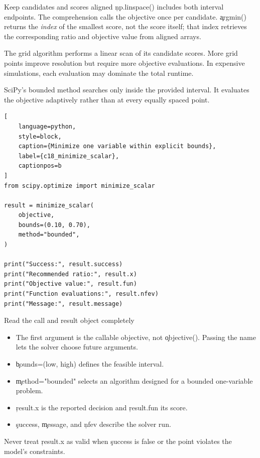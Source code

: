 \begin{SyntaxBox}{Keep candidates and scores aligned}
\c{np.linspace()} includes both interval endpoints. The comprehension calls the
objective once per candidate. \c{argmin()} returns the \emph{index} of the
smallest score, not the score itself; that index retrieves the corresponding
ratio and objective value from aligned arrays.
\end{SyntaxBox}

The grid algorithm performs a linear scan of its candidate scores. More grid
points improve resolution but require more objective evaluations. In expensive
simulations, each evaluation may dominate the total runtime.


SciPy's bounded method searches only inside the provided interval. It evaluates
the objective adaptively rather than at every equally spaced point.

\begin{lstlisting}[
    language=python,
    style=block,
    caption={Minimize one variable within explicit bounds},
    label={c18_minimize_scalar},
    captionpos=b
]
from scipy.optimize import minimize_scalar

result = minimize_scalar(
    objective,
    bounds=(0.10, 0.70),
    method="bounded",
)

print("Success:", result.success)
print("Recommended ratio:", result.x)
print("Objective value:", result.fun)
print("Function evaluations:", result.nfev)
print("Message:", result.message)
\end{lstlisting}

\begin{SyntaxBox}{Read the call and result object completely}
\begin{itemize}
    \item The first argument is the callable objective, not \c{objective()}.
          Passing the name lets the solver choose future arguments.
    \item \c{bounds=(low, high)} defines the feasible interval.
    \item \c{method="bounded"} selects an algorithm designed for a bounded
          one-variable problem.
    \item \c{result.x} is the reported decision and \c{result.fun} its score.
    \item \c{success}, \c{message}, and \c{nfev} describe the solver run.
\end{itemize}
Never treat \c{result.x} as valid when \c{success} is false or the point violates
the model's constraints.
\end{SyntaxBox}


